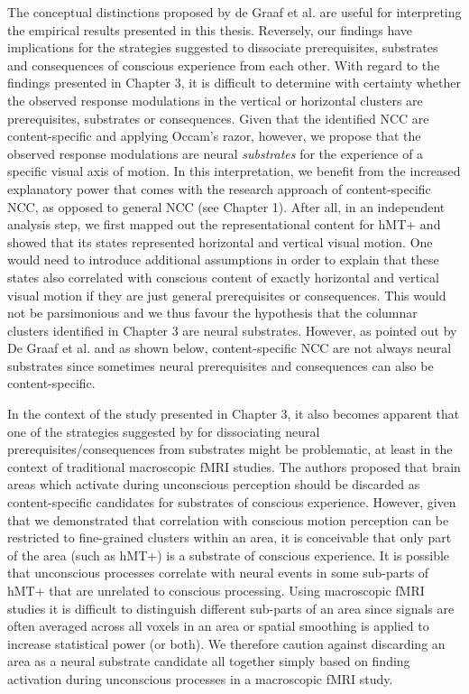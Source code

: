 The conceptual distinctions proposed by de Graaf et al. are useful for interpreting the empirical results presented in this thesis. Reversely, our findings have implications for the strategies suggested to dissociate prerequisites, substrates and consequences of conscious experience from each other. With regard to the findings presented in Chapter 3, it is difficult to determine with certainty whether the observed response modulations in the vertical or horizontal clusters are prerequisites, substrates or consequences. Given that the identified NCC are content-specific and applying Occam's razor, however, we propose that the observed response modulations are neural \textit{substrates} for the experience of a specific visual axis of motion. In this interpretation, we benefit from the increased explanatory power that comes with the research approach of content-specific NCC, as opposed to general NCC (see Chapter 1). After all, in an independent analysis step, we first mapped out the representational content for hMT+ and showed that its states represented horizontal and vertical visual motion. One would need to introduce additional assumptions in order to explain that these states also correlated with conscious content of exactly horizontal and vertical visual motion if they are just general prerequisites or consequences. This would not be parsimonious and we thus favour the hypothesis that the columnar clusters identified in Chapter 3 are neural substrates. However, as pointed out by De Graaf et al. \parencite*{DeGraaf2012} and as shown below, content-specific NCC are not always neural substrates since sometimes neural prerequisites and consequences can also be content-specific.

In the context of the study presented in Chapter 3, it also becomes apparent that one of the strategies suggested by \cite{DeGraaf2012} for dissociating neural prerequisites/consequences from substrates might be problematic, at least in the context of traditional macroscopic fMRI studies. The authors proposed that brain areas which activate during unconscious perception should be discarded as content-specific candidates for substrates of conscious experience. However, given that we demonstrated that correlation with conscious motion perception can be restricted to fine-grained clusters within an area, it is conceivable that only part of the area (such as hMT+) is a substrate of conscious experience. It is possible that unconscious processes correlate with neural events in some sub-parts of hMT+ that are unrelated to conscious processing. Using macroscopic fMRI studies it is difficult to distinguish different sub-parts of an area since signals are often averaged across all voxels in an area or spatial smoothing is applied to increase statistical power (or both). We therefore caution against discarding an area as a neural substrate candidate all together simply based on finding activation during unconscious processes in a macroscopic fMRI study.

